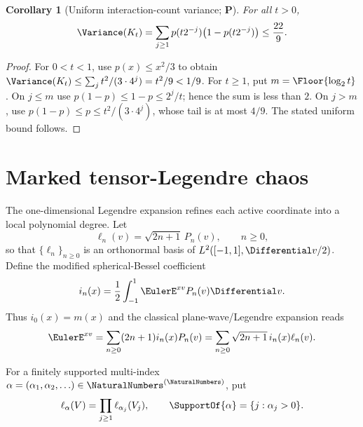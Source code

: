 \documentclass[11pt,oneside]{article}
\newtheorem{corollary}[theorem]{Corollary}
\theoremstyle{definition}
\theoremstyle{remark}
\newcommand{\statusP}{\textcolor{deepgreen}{\textbf{P}}}
\begin{document}
\begin{corollary}[Uniform interaction-count variance; \statusP]
\label{cor:K-variance-bound}
For all $t>0$,
\begin{equation}
 \Variance(K_t)=\sum_{j\ge1}p(t2^{-j})\bigl(1-p(t2^{-j})\bigr)
 \le\frac{22}{9}.
 \label{eq:K-var-bound}
\end{equation}
\end{corollary}

\begin{proof}
For $0<t<1$, use $p(x)\le x^2/3$ to obtain
$\Variance(K_t)\le\sum_jt^2/(3\cdot4^j)=t^2/9<1/9$.
For $t\ge1$, put $m=\Floor{\log_2t}$.  On $j\le m$ use
$p(1-p)\le1-p\le2^j/t$; hence the sum is less than $2$.  On $j>m$, use
$p(1-p)\le p\le t^2/(3\cdot4^j)$, whose tail is at most $4/9$.  The stated
uniform bound follows.
\end{proof}

\section{Marked tensor-Legendre chaos}
\label{sec:Legendre-chaos}

The one-dimensional Legendre expansion refines each active coordinate into a
local polynomial degree.  Let
\begin{equation}
 \ell_n(v)=\sqrt{2n+1}\,P_n(v),\qquad n\ge0,
 \label{eq:normalized-Legendre}
\end{equation}
so that $\{\ell_n\}_{n\ge0}$ is an orthonormal basis of
$L^2([-1,1],\Differential v/2)$.  Define the modified spherical-Bessel coefficient
\begin{equation}
 i_n(x)=\frac12\int_{-1}^1\EulerE^{xv}P_n(v)\Differential v.
 \label{eq:i-n}
\end{equation}
Thus $i_0(x)=m(x)$ and the classical plane-wave/Legendre expansion reads
\begin{equation}
 \EulerE^{xv}=\sum_{n\ge0}(2n+1)i_n(x)P_n(v)
        =\sum_{n\ge0}\sqrt{2n+1}\,i_n(x)\ell_n(v).
 \label{eq:local-Legendre-expansion}
\end{equation}

For a finitely supported multi-index
$\alpha=(\alpha_1,\alpha_2,\ldots)\in\NaturalNumbers^{(\NaturalNumbers)}$, put
\begin{equation}
 \ell_\alpha(V)=\prod_{j\ge1}\ell_{\alpha_j}(V_j),
 \qquad \SupportOf{\alpha}=\{j:\alpha_j>0\}.
 \label{eq:tensor-Legendre}
\end{equation}
\end{document}
